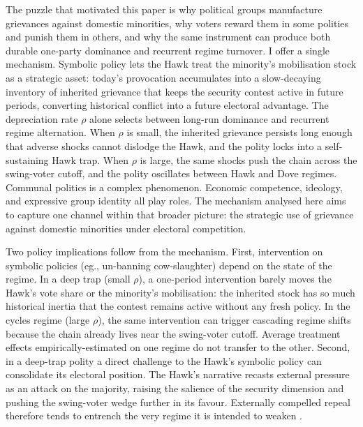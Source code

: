 \documentclass[11pt,twoside]{extarticle}
\begin{document}
The puzzle that motivated this paper is why political groups manufacture grievances against domestic minorities, why voters reward them in some polities and punish them in others, and why the same instrument can produce both durable one-party dominance and recurrent regime turnover. I offer a single mechanism. Symbolic policy lets the Hawk treat the minority's mobilisation stock as a strategic asset: today's provocation accumulates into a slow-decaying inventory of inherited grievance that keeps the security contest active in future periods, converting historical conflict into a future electoral advantage. The depreciation rate $\rho$ alone selects between long-run dominance and recurrent regime alternation. When $\rho$ is small, the inherited grievance persists long enough that adverse shocks cannot dislodge the Hawk, and the polity locks into a self-sustaining Hawk trap. When $\rho$ is large, the same shocks push the chain across the swing-voter cutoff, and the polity oscillates between Hawk and Dove regimes. Communal politics is a complex phenomenon. Economic competence, ideology, and expressive group identity all play roles. The mechanism analysed here aims to capture one channel within that broader picture: the strategic use of grievance against domestic minorities under electoral competition.

Two policy implications follow from the mechanism. First, intervention on symbolic policies (eg., un-banning cow-slaughter) depend on the state of the regime. In a deep trap (small $\rho$), a one-period intervention barely moves the Hawk's vote share or the minority's mobilisation: the inherited stock has so much historical inertia that the contest remains active without any fresh policy. In the cycles regime (large $\rho$), the same intervention can trigger cascading regime shifts because the chain already lives near the swing-voter cutoff. Average treatment effects empirically-estimated on one regime do not transfer to the other. Second, in a deep-trap polity a direct challenge to the Hawk's symbolic policy can consolidate its electoral position. The Hawk's narrative recasts external pressure as an attack on the majority, raising the salience of the security dimension and pushing the swing-voter wedge further in its favour. Externally compelled repeal therefore tends to entrench the very regime it is intended to weaken \citet*{carvalhoResistingEducation2024a}.
\end{document}
